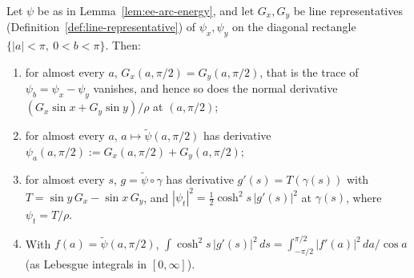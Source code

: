 \begin{lemma}
\label{lem:arc-trace-identification}
\leanok
Let $\psi$ be as in Lemma~\ref{lem:ee-arc-energy}, and let $G_x,G_y$ be line representatives
(Definition~\ref{def:line-representative}) of $\psi_x,\psi_y$ on the diagonal rectangle
$\{|a|<\pi,\ 0<b<\pi\}$. Then:
\begin{enumerate}
  \item for almost every $a$, $G_x(a,\pi/2)=G_y(a,\pi/2)$, that is the trace of
        $\psi_b=\psi_x-\psi_y$ vanishes, and hence so does the normal derivative
        $(G_x\sin x+G_y\sin y)/\rho$ at $(a,\pi/2)$;
  \item for almost every $a$, $a\mapsto\tilde\psi(a,\pi/2)$ has derivative
        $\psi_a(a,\pi/2):=G_x(a,\pi/2)+G_y(a,\pi/2)$;
  \item for almost every $s$, $g=\tilde\psi\circ\gamma$ has derivative
        $g'(s)=T(\gamma(s))$ with $T=\sin y\,G_x-\sin x\,G_y$, and
        $|\psi_t|^2=\frac12\cosh^2s\,|g'(s)|^2$ at $\gamma(s)$, where $\psi_t=T/\rho$.
  \item With $f(a)=\tilde\psi(a,\pi/2)$,
        $\int\cosh^2s\,|g'(s)|^2\,ds=\int_{-\pi/2}^{\pi/2}|f'(a)|^2\,da/\cos a$ (as Lebesgue
        integrals in $[0,\infty]$).
\end{enumerate}
\end{lemma}

